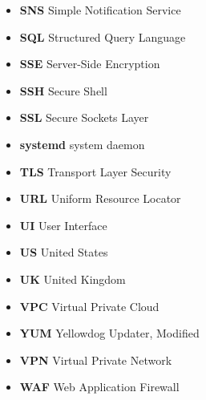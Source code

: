 \begin{itemize}
    \item  \textbf{SNS} \textemdash Simple Notification Service
    \item  \textbf{SQL} \textemdash Structured Query Language
    \item  \textbf{SSE} \textemdash Server-Side Encryption
    \item  \textbf{SSH} \textemdash Secure Shell
    \item  \textbf{SSL} \textemdash Secure Sockets Layer
    \item  \textbf{systemd} \textemdash system daemon
    \item  \textbf{TLS} \textemdash Transport Layer Security
    \item  \textbf{URL} \textemdash Uniform Resource Locator
    \item  \textbf{UI}  \textemdash User Interface
    \item  \textbf{US}  \textemdash United States
    \item  \textbf{UK}  \textemdash United Kingdom
    \item  \textbf{VPC} \textemdash Virtual Private Cloud
    \item  \textbf{YUM} \textemdash Yellowdog Updater, Modified
    \item  \textbf{VPN} \textemdash Virtual Private Network
    \item  \textbf{WAF} \textemdash Web Application Firewall
\end{itemize}